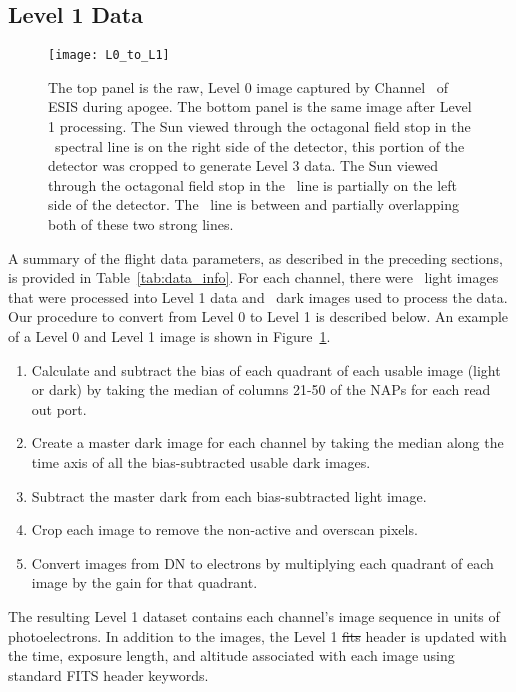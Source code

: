 \subsection{Level 1 Data}
	    \begin{figure}
	    	\centering
	    	\texttt{[image: L0\_to\_L1]}
	    	\caption{The top panel is the raw, Level 0 image captured by Channel \ of ESIS during apogee. The bottom panel is the same image after Level 1 processing. The Sun viewed through the octagonal field stop in the \ov \ spectral line is on the right side of the detector, this portion of the detector was cropped to generate Level 3 data.  The Sun viewed through the octagonal field stop in the \hei \ line is partially on the left side of the detector. The \mgxbright \ line is between and partially overlapping both of these two strong lines.}
	    	\label{fig:L0_to_L1}
	    \end{figure}
    	
A summary of the flight data parameters, as described in the preceding sections, is provided in Table~\ref{tab:data_info}. 
For each channel, there were \numDataFrames\ light images that were processed into Level 1 data and \numDarkFrames\ dark images used to process the data.
Our procedure to convert from Level 0 to Level 1 is described below. An example of a Level 0 and Level 1 image is shown in Figure~\ref{fig:L0_to_L1}.

\begin{enumerate}
    \item Calculate and subtract the bias of each quadrant of each usable image (light or dark) by taking the median of columns 21-50 of the NAPs for each read out port.   
    \item Create a master dark image for each channel by taking the median along the time axis of all the bias-subtracted usable dark images.
    \item Subtract the master dark from each bias-subtracted light image.
    \item Crop each image to remove the non-active and overscan pixels.
    \item Convert images from DN to electrons by multiplying each quadrant of each image by the gain for that quadrant.
\end{enumerate}
The resulting Level 1 dataset contains each channel's image sequence in units of photoelectrons.
In addition to the images, the Level 1 \sout{fits} header is updated with the time, exposure length, and altitude associated with each image using standard FITS header keywords.   
	

